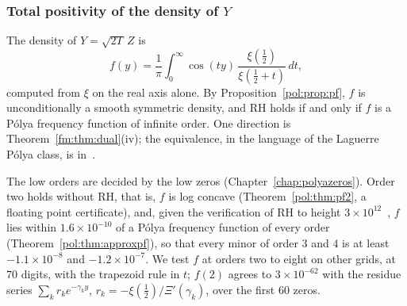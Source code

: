 \subsubsection{Total positivity of the density of \texorpdfstring{$Y$}{Y}}\label{gl:sec:pfnum}

The density of $Y=\sqrt{2T}\,Z$ is
\[
f(y)=\frac1\pi\int_0^\infty\cos(ty)\,\frac{\xi(\tfrac12)}{\xi(\tfrac12+t)}\,dt,
\]
computed from $\xi$ on the real axis alone. By Proposition~\ref{pol:prop:pf}, $f$ is unconditionally a smooth symmetric density, and RH holds if and only if $f$ is a P\'olya frequency function of infinite order. One direction is Theorem~\ref{fm:thm:dual}(iv); the equivalence, in the language of the Laguerre P\'olya class, is in~\cite[Theorem 2.3 and Corollary 2.4]{KPS24}.

The low orders are decided by the low zeros (Chapter~\ref{chap:polyazeros}). Order two holds without RH, that is, $f$ is log concave (Theorem~\ref{pol:thm:pf2}, a floating point certificate), and, given the verification of RH to height $3\times10^{12}$~\cite{PT21}, $f$ lies within $1.6\times10^{-10}$ of a P\'olya frequency function of every order (Theorem~\ref{pol:thm:approxpf}), so that every minor of order $3$ and $4$ is at least $-1.1\times10^{-8}$ and $-1.2\times10^{-7}$. We test $f$ at orders two to eight on other grids, at $70$ digits, with the trapezoid rule in $t$; $f(2)$ agrees to $3\times10^{-62}$ with the residue series $\sum_kr_ke^{-\gamma_ky}$, $r_k=-\xi(\tfrac12)/\Xi'(\gamma_k)$, over the first $60$ zeros.

